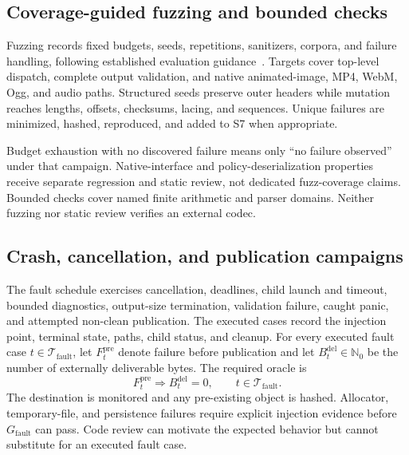 \subsection{Coverage-guided fuzzing and bounded checks}
\label{subsec:fuzzing}

Fuzzing records fixed budgets, seeds, repetitions, sanitizers, corpora, and
failure handling, following established evaluation guidance~\cite{klees2018}.
Targets cover top-level dispatch, complete output validation, and native
animated-image, MP4, WebM, Ogg, and audio paths. Structured seeds preserve outer
headers while mutation reaches lengths, offsets, checksums, lacing, and
sequences. Unique failures are minimized, hashed, reproduced, and added to S7
when appropriate.

Budget exhaustion with no discovered failure means only ``no failure observed''
under that campaign. Native-interface and policy-deserialization properties
receive separate regression and static review, not dedicated fuzz-coverage claims.
Bounded checks cover named finite arithmetic and parser domains. Neither
fuzzing nor static review verifies an external codec.

\subsection{Crash, cancellation, and publication campaigns}
\label{subsec:fault-campaigns}

The fault schedule exercises cancellation, deadlines, child launch and timeout,
bounded diagnostics, output-size termination, validation failure, caught panic,
and attempted non-clean publication. The executed cases record the injection point, terminal
state, paths, child status, and cleanup. For every executed fault case
\(t\in\mathcal T_{\mathrm{fault}}\), let \(F_t^{\mathrm{pre}}\) denote failure
before publication and let \(B_t^{\mathrm{del}}\in\mathbb N_0\) be the number
of externally deliverable bytes. The required oracle is
\begin{equation}
 F_t^{\mathrm{pre}} \Longrightarrow B_t^{\mathrm{del}}=0,
 \qquad t\in\mathcal T_{\mathrm{fault}}.
 \label{eq:no-publication}
\end{equation}
The destination is monitored and any pre-existing object is hashed. Allocator,
temporary-file, and persistence failures require explicit injection evidence
before \(G_{\mathrm{fault}}\) can pass. Code review can motivate the expected
behavior but cannot substitute for an executed fault case.

